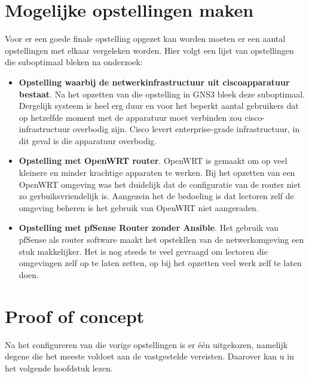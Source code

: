 \section{Mogelijke opstellingen maken}
Voor er een goede finale opstelling opgezet kan worden moeten er een aantal opstellingen met elkaar vergeleken worden. Hier volgt een lijst van opstellingen die suboptimaal bleken na onderzoek:
\begin{itemize}
	\item \textbf{Opstelling waarbij de netwerkinfrastructuur uit ciscoapparatuur bestaat}. Na het opzetten van die opstelling in GNS3 bleek deze suboptimaal. Dergelijk systeem is heel erg duur en voor het beperkt aantal gebruikers dat op hetzelfde moment met de apparatuur moet verbinden zou cisco-infrastructuur overbodig zijn. Cisco levert enterprise-grade infrastructuur, in dit geval is die apparatuur overbodig. 
	\item \textbf{Opstelling met OpenWRT router}. OpenWRT is gemaakt om op veel kleinere en minder krachtige apparaten te werken. Bij het opzetten van een OpenWRT omgeving was het duidelijk dat de configuratie van de router niet zo gerbuiksvriendelijk is. Aangezein het de bedoeling is dat lectoren zelf de omgeving beheren is het gebruik van OpenWRT niet aangeraden. 
	\item \textbf{Opstelling met pfSense Router zonder Ansible}. Het gebruik van pfSense als router software maakt het opstekllen van de netwerkomgeving een stuk makkelijker. Het is nog steeds te veel gevraagd om lectoren die omgevingen zelf op te laten zetten, op bij het opzetten veel werk zelf te laten doen.  
	 
\end{itemize} 

\section{Proof of concept}
Na het configureren van die vorige opstellingen is er \'{e}\'{e}n uitgekozen, namelijk degene die het meeste voldoet aan de vastgestelde vereisten. Daarover kan u in het volgende hoofdstuk lezen.
